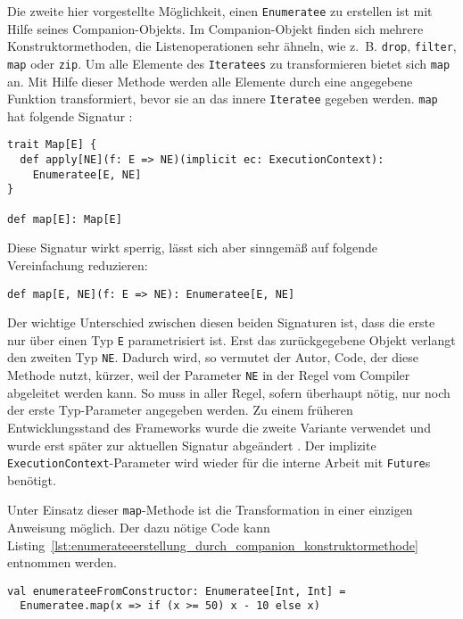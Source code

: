 Die zweite hier vorgestellte Möglichkeit, einen \lstinline|Enumeratee| zu erstellen ist mit Hilfe seines Companion-Objekts.
Im Companion-Objekt finden sich mehrere Konstruktormethoden, die Listenoperationen sehr ähneln, wie z.~B. \lstinline|drop|, \lstinline|filter|, \lstinline|map| oder \lstinline|zip|.
Um alle Elemente des \lstinline|Iteratees| zu transformieren bietet sich \lstinline|map| an.
Mit Hilfe dieser Methode werden alle Elemente durch eine angegebene Funktion transformiert, bevor sie an das innere \lstinline|Iteratee| gegeben werden.
\lstinline|map| hat folgende Signatur \cite[vgl.][Z.~361]{play_enumeratee_source_code}:
\begin{lstlisting}[caption=Die Signatur von Enumeratee.map, label=lst:die_signatur_von_enumeratee_map]
trait Map[E] {
  def apply[NE](f: E => NE)(implicit ec: ExecutionContext):
    Enumeratee[E, NE]
}

def map[E]: Map[E]
\end{lstlisting}
Diese Signatur wirkt sperrig, lässt sich aber sinngemäß auf folgende Vereinfachung reduzieren:
\begin{lstlisting}[caption=Die vereinfachte Signatur von Enumeratee.map, label=lst:die_vereinfachte_signatur_von_enumeratee_map]
def map[E, NE](f: E => NE): Enumeratee[E, NE]
\end{lstlisting}

Der wichtige Unterschied zwischen diesen beiden Signaturen ist, dass die erste nur über einen Typ \lstinline|E| parametrisiert ist.
Erst das zurückgegebene Objekt verlangt den zweiten Typ \lstinline|NE|.
Dadurch wird, so vermutet der Autor, Code, der diese Methode nutzt, kürzer, weil der Parameter \lstinline|NE| in der Regel vom Compiler abgeleitet werden kann.
So muss in aller Regel, sofern überhaupt nötig, nur noch der erste Typ-Parameter angegeben werden.
Zu einem früheren Entwicklungsstand des Frameworks wurde die zweite Variante verwendet und wurde erst später zur aktuellen Signatur abgeändert \cite[vgl.][]{play_enumeratee_map_signatur}.
Der implizite \lstinline|ExecutionContext|-Parameter wird wieder für die interne Arbeit mit \lstinline|Future|s benötigt.

Unter Einsatz dieser \lstinline|map|-Methode ist die Transformation in einer einzigen Anweisung möglich.
Der dazu nötige Code kann Listing~\ref{lst:enumerateeerstellung_durch_companion_konstruktormethode} entnommen werden.

\begin{lstlisting}[caption=Erstellung eines Enumeratees durch die map-Konstruktormethode, label=lst:enumerateeerstellung_durch_companion_konstruktormethode]
val enumerateeFromConstructor: Enumeratee[Int, Int] =
  Enumeratee.map(x => if (x >= 50) x - 10 else x)
\end{lstlisting}

